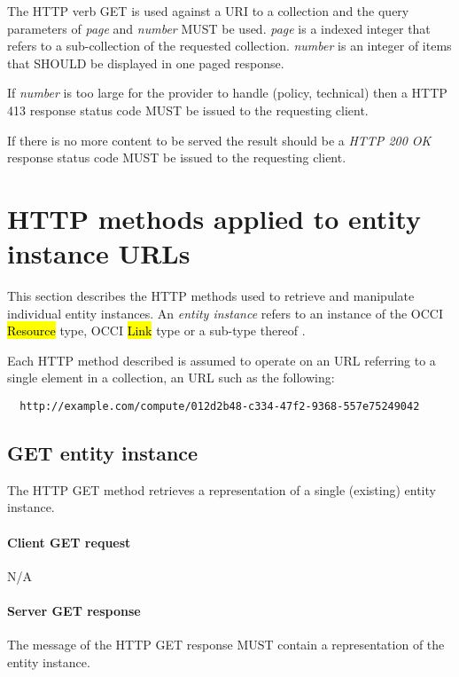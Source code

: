\documentclass[10pt,a4paper]{article}
\begin{document}
The HTTP verb GET is used against a URI to a collection and the query parameters of {\em page} and {\em number} MUST be used. {\em page} is a indexed 
integer that refers to a sub-collection of the requested collection. {\em number} is an integer of items that SHOULD be displayed in one paged response.


If {\em number} is too large for the provider to handle (policy, technical) then a HTTP 413 response status code MUST be issued to the requesting client.

If there is no more content to be served the result should be a \emph{HTTP 200 OK} response status code MUST be issued to the requesting client.


\section{HTTP methods applied to entity instance URLs}


This section describes the HTTP methods used to retrieve and manipulate
individual entity instances. An {\em entity instance} refers to an instance
of the OCCI \hl{Resource} type, OCCI \hl{Link} type or a sub-type thereof
\cite{occi:core}.

Each HTTP method described is assumed to operate
on an URL referring to a single element in a collection, an URL such as the
following:
\begin{verbatim}
  http://example.com/compute/012d2b48-c334-47f2-9368-557e75249042
\end{verbatim}

\subsection{GET entity instance}
The HTTP GET method retrieves a representation of a single (existing) entity instance.

\paragraph{Client GET request}
N/A

\paragraph{Server GET response}
The message of the HTTP GET response MUST contain a representation of the entity instance.
\end{document}

